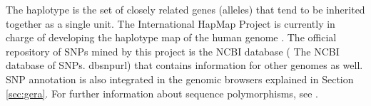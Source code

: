 The haplotype is the set of closely related genes (alleles) that tend to be inherited together as 
a single unit.  
The International HapMap Project is currently in charge of developing the haplotype 
map of the human genome \citep{tihc:2003a}. The official repository of SNPs mined by this project
is the NCBI \dbsnp{} database
(%
    {\dbsnp{}}%
    {%
     The NCBI database of SNPs.
    }%
    {dbsnpurl}) %
that contains information for other genomes as well. SNP annotation is also integrated in the 
genomic browsers explained in Section \ref{sec:gera}. For further information about sequence
polymorphisms, see \citet{mullikin:2005a}.


{}
